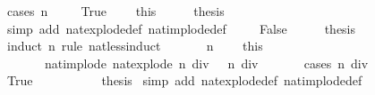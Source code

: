 \begin{isabellebody}
%
\isadelimproof
%
\endisadelimproof
%
\isatagproof
{}\isamarkupfalse%
\ {\isacharparenleft}{\kern0pt}cases\ {\isacartoucheopen}n{\isacharequal}{\kern0pt}{}{\isacartoucheclose}{\isacharparenright}{\kern0pt}\ \isanewline
\ \ \isamarkupfalse%
\ True\ \isamarkupfalse%
\ {\isacharasterisk}{\kern0pt}\ {\isacharequal}{\kern0pt}\ this\isanewline
\ \ \isamarkupfalse%
\ \isamarkupfalse%
\ {\isacharquery}{\kern0pt}thesis\ \isanewline
\ \ \ \ \isamarkupfalse%
\ {\isacharparenleft}{\kern0pt}simp\ add{\isacharcolon}{\kern0pt}\ nat{\isacharunderscore}{\kern0pt}explode{\isacharunderscore}{\kern0pt}def\ nat{\isacharunderscore}{\kern0pt}implode{\isacharunderscore}{\kern0pt}def{\isacharparenright}{\kern0pt}\ \isanewline
{}\isamarkupfalse%
\isanewline
\ \ \isamarkupfalse%
\ False\isanewline
\ \ \isamarkupfalse%
\ \isamarkupfalse%
\ {\isacharquery}{\kern0pt}thesis\ \isanewline
\ \ \isamarkupfalse%
\ {\isacharparenleft}{\kern0pt}induct\ {\isacartoucheopen}n{\isacartoucheclose}\ rule{\isacharcolon}{\kern0pt}\ nat{\isacharunderscore}{\kern0pt}less{\isacharunderscore}{\kern0pt}induct{\isacharparenright}{\kern0pt}\isanewline
\ \ \ \ \isamarkupfalse%
\ {\isacharparenleft}{\kern0pt}{}\ n{\isacharparenright}{\kern0pt}\ \isamarkupfalse%
\ {\isacharasterisk}{\kern0pt}\ {\isacharequal}{\kern0pt}\ this\isanewline
\ \ \ \ \isamarkupfalse%
\ \ \isamarkupfalse%
\ \isanewline
\ \ \ \ \ \ {\isacharasterisk}{\kern0pt}{\isacharasterisk}{\kern0pt}{\isacharcolon}{\kern0pt}\ {\isacartoucheopen}nat{\isacharunderscore}{\kern0pt}implode\ {\isacharparenleft}{\kern0pt}nat{\isacharunderscore}{\kern0pt}explode\ {\isacharparenleft}{\kern0pt}n\ div\ {}{}{\isacharparenright}{\kern0pt}{\isacharparenright}{\kern0pt}\ {\isacharequal}{\kern0pt}\ n\ div\ {}{}{\isacartoucheclose}\isanewline
\ \ \ \ \isamarkupfalse%
\ {\isacharparenleft}{\kern0pt}cases\ {\isacartoucheopen}n\ div\ {}{}\ {\isacharequal}{\kern0pt}\ {}{\isacartoucheclose}{\isacharparenright}{\kern0pt}\ \isanewline
\ \ \ \ \ \ \isamarkupfalse%
\ True\ \isanewline
\ \ \ \ \ \ \isamarkupfalse%
\ \isamarkupfalse%
\ {\isacharquery}{\kern0pt}thesis\ \isamarkupfalse%
{\isacharparenleft}{\kern0pt}simp\ add{\isacharcolon}{\kern0pt}\ nat{\isacharunderscore}{\kern0pt}explode{\isacharunderscore}{\kern0pt}def\ nat{\isacharunderscore}{\kern0pt}implode{\isacharunderscore}{\kern0pt}def{\isacharparenright}{\kern0pt}\isanewline

\end{isabellebody}
